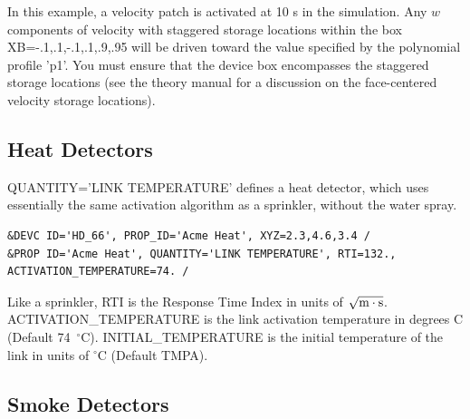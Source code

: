 \documentclass[11pt]{book}
\begin{document}
\noindent
In this example, a velocity patch is activated at 10 s in the simulation.  Any $w$ components of velocity with staggered storage locations within the box {\ct XB=-.1,.1,-.1,.1,.9,.95} will be driven toward the value specified by the polynomial profile {\ct 'p1'}.  You must ensure that the device box encompasses the staggered storage locations (see the theory manual \cite{FDS_Math_Guide} for a discussion on the face-centered velocity storage locations).

\subsection{Heat Detectors}
\label{info:heat_detectors}

{\ct QUANTITY='LINK TEMPERATURE'} defines a heat detector, which uses essentially the same activation algorithm as a sprinkler, without the water spray.
\begin{lstlisting}
&DEVC ID='HD_66', PROP_ID='Acme Heat', XYZ=2.3,4.6,3.4 /
&PROP ID='Acme Heat', QUANTITY='LINK TEMPERATURE', RTI=132., ACTIVATION_TEMPERATURE=74. /
\end{lstlisting}
Like a sprinkler, {\ct RTI} is the Response Time Index in units of $\sqrt{\hbox{m}\cdot \hbox{s}}$. {\ct ACTIVATION\_TEMPERATURE} is the link activation temperature in degrees C (Default 74~$^\circ$C). {\ct INITIAL\_TEMPERATURE} is the initial temperature of the link in units of $^\circ$C (Default {\ct TMPA}).



\subsection{Smoke Detectors}
\label{info:smoke_detector}
\end{document}
